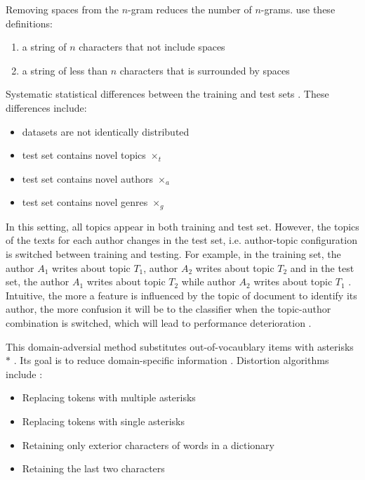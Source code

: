 \begin{definition}
    Removing spaces from the $n$-gram reduces the number of $n$-grams.
    \citet{koppel_authorship_2011} use these definitions:
    \begin{enumerate}
        \item a string of $n$ characters that not include spaces
        \item a string of less than $n$ characters that is surrounded by spaces
    \end{enumerate}
\end{definition}

\begin{definition}
    Systematic statistical differences between the training and test sets \cite{tyo_state_2022}.
    These differences include:
    \begin{itemize}
        \item datasets are not identically distributed
        \item test set contains novel topics $\times_t$
        \item test set contains novel authors $\times_a$
        \item test set contains novel genres $\times_g$
    \end{itemize}
\end{definition}

\begin{definition}
    In this setting, all topics appear in both training and test set. 
    However, the topics of the texts for each author changes in the test set, 
    i.e. author-topic configuration is switched between training and testing.
    For example, in the training set, the author $A_1$ writes about topic $T_1$, author $A_2$ writes about topic $T_2$ 
    and in the test set, 
    the author $A_1$ writes about topic $T_2$ while author $A_2$ writes about topic $T_1$ \cite{tyo_state_2022,altakrori_topic_2021}.
    Intuitive, the more a feature is influenced by the topic of document to identify its author, 
    the more confusion it will be to the classifier when the topic-author combination is switched, which will lead to performance deterioration \cite{altakrori_topic_2021}.
\end{definition}

\begin{definition}
    This domain-adversial method substitutes out-of-vocaublary items with asterisks $*$ \cite{tyo_state_2022}.
    Its goal is to reduce domain-specific information \cite{bischoff_importance_2020}.
    Distortion algorithms include \cite{bischoff_importance_2020}:
    \begin{itemize}
        \item Replacing tokens with multiple asterisks
        \item Replacing tokens with single asterisks
        \item Retaining only exterior characters of words in a dictionary
        \item Retaining the last two characters
    \end{itemize}
\end{definition}

